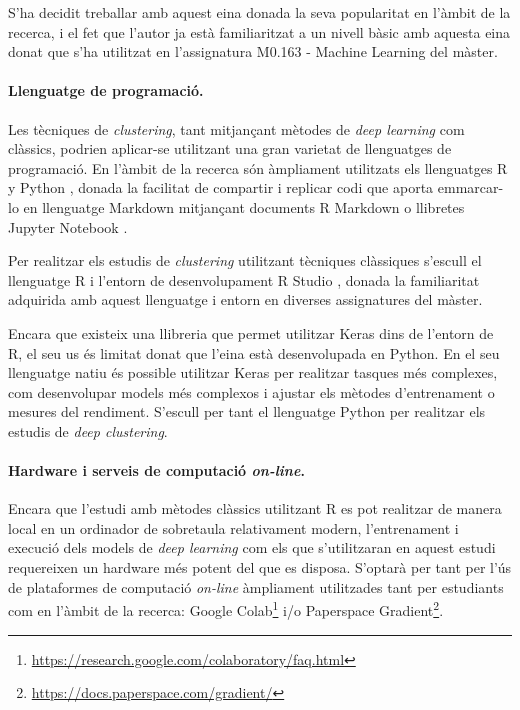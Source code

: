 \documentclass[CAT,BIB]{TFUOC}%
\begin{document}
            S'ha decidit treballar amb aquest eina donada la seva popularitat en l'àmbit de la recerca, i el fet que l'autor ja està familiaritzat a un nivell bàsic amb aquesta eina donat que s'ha utilitzat en l'assignatura M0.163 - Machine Learning del màster.

        \paragraph{Llenguatge de programació.}

            Les tècniques de \textit{clustering}, tant mitjançant mètodes de \textit{deep learning} com clàssics, podrien aplicar-se utilitzant una gran varietat de llenguatges de programació. En l'àmbit de la recerca són àmpliament utilitzats els llenguatges \textsf{R} \citep{RCoreTeam2017} y Python \citep{VanRossum2009} \citep{Kaggle2021}, donada la facilitat de compartir i replicar codi que aporta emmarcar-lo en llenguatge Markdown mitjançant documents R Markdown \citep{Xie2016} o llibretes Jupyter Notebook \citep{Kluyver2016}.

            Per realitzar els estudis de \textit{clustering} utilitzant tècniques clàssiques s'escull el llenguatge \textsf{R} i l'entorn de desenvolupament \textsf{R} Studio \citep{RStudioTeam2020}, donada la familiaritat adquirida amb aquest llenguatge i entorn en diverses assignatures del màster.

            Encara que existeix una llibreria que permet utilitzar Keras dins de l'entorn de \textsf{R}, el seu us és limitat donat que l'eina està desenvolupada en Python. En el seu llenguatge natiu és possible utilitzar Keras per realitzar tasques més complexes, com desenvolupar models més complexos i ajustar els mètodes d'entrenament o mesures del rendiment. S'escull per tant el llenguatge Python per realitzar els estudis de \textit{deep clustering}.

        \paragraph{Hardware i serveis de computació \textit{on-line}.}

            Encara que l'estudi amb mètodes clàssics utilitzant \textsf{R} es pot realitzar de manera local en un ordinador de sobretaula relativament modern, l'entrenament i execució dels models de \textit{deep learning} com els que s'utilitzaran en aquest estudi requereixen un hardware més potent del que es disposa. S'optarà per tant per l'ús de plataformes de computació \textit{on-line} àmpliament utilitzades tant per estudiants com en l'àmbit de la recerca: Google Colab\footnote{\url{https://research.google.com/colaboratory/faq.html}} i/o Paperspace Gradient\footnote{\url{https://docs.paperspace.com/gradient/}}.
\end{document}
